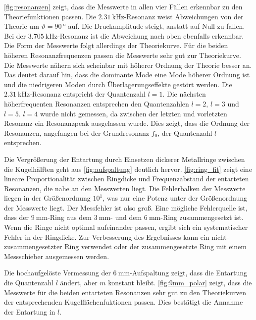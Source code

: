 \noindent
\autoref{fig:resonanzen} zeigt, dass die Messwerte in allen vier Fällen erkennbar zu den Theoriefunktionen passen.
Die $\qty{2.31}{\kilo\hertz}$-Resonanz weist Abweichungen von der Theorie um $\vartheta=\qty{90}{\degree}$ auf.
Die Druckamplitude steigt, anstatt auf Null zu fallen.
Bei der $\qty{3.705}{\kilo\hertz}$-Resonanz ist die Abweichung nach oben ebenfalls erkennbar.
Die Form der Messwerte folgt allerdings der Theoriekurve.
Für die beiden höheren Resonanzfrequenzen passen die Messwerte sehr gut zur Theoriekurve.
Die Messwerte nähern sich scheinbar mit höherer Ordnung der Theorie besser an.
Das deutet darauf hin, dass die dominante Mode eine Mode höherer Ordnung ist und die niedrigeren Moden durch Überlagerungseffekte gestört werden.
Die $\qty{2.31}{\kilo\hertz}$-Resonanz entspricht der Quantenzahl $l=1$.
Die nächsten höherfrequenten Resonanzen entsprechen den Quantenzahlen $l=2$, $l=3$ und $l=5$.
$l=4$ wurde nicht gemessen, da zwischen der letzten und vorletzten Resonanz ein Resonanzpeak ausgelassen wurde.
Dies zeigt, dass die Ordnung der Resonanzen, angefangen bei der Grundresonanz $f_0$, der Quantenzahl $l$ entsprechen.

\noindent
Die Vergrößerung der Entartung durch Einsetzen dickerer Metallringe zwischen die Kugelhälften geht aus \autoref{fig:aufspaltung} deutlich hervor.
\autoref{fig:ring_fit} zeigt eine lineare Proportionalität zwischen Ringdicke und Frequenzabstand der entarteten Resonanzen, die nahe an den Messwerten liegt.
Die Fehlerbalken der Messwerte liegen in der Größenordnung $10^1$, was nur eine Potenz unter der Größenordnung der Messwerte liegt.
Der Messfehler ist also groß.
Eine mögliche Fehlerquelle ist, dass der $\qty{9}{\milli\meter}$-Ring aus dem $\qty{3}{\milli\meter}$- und dem $\qty{6}{\milli\meter}$-Ring zusammengesetzt ist.
Wenn die Ringe nicht optimal aufeinander passen, ergibt sich ein systematischer Fehler in der Ringdicke.
Zur Verbesserung des Ergebnisses kann ein nicht-zusammengesetzter Ring verwendet oder der zusammengesetzte Ring mit einem Messschieber ausgemessen werden.

\noindent
Die hochaufgelöste Vermessung der $\qty{6}{\milli\meter}$-Aufspaltung zeigt, dass die Entartung die Quantenzahl $l$ ändert, aber $m$ konstant bleibt.
\autoref{fig:9mm_polar} zeigt, dass die Messwerte für die beiden entarteten Resonanzen sehr gut zu den Theoriekurven der entsprechenden Kugelflächenfuktionen passen.
Dies bestätigt die Annahme der Entartung in $l$.
